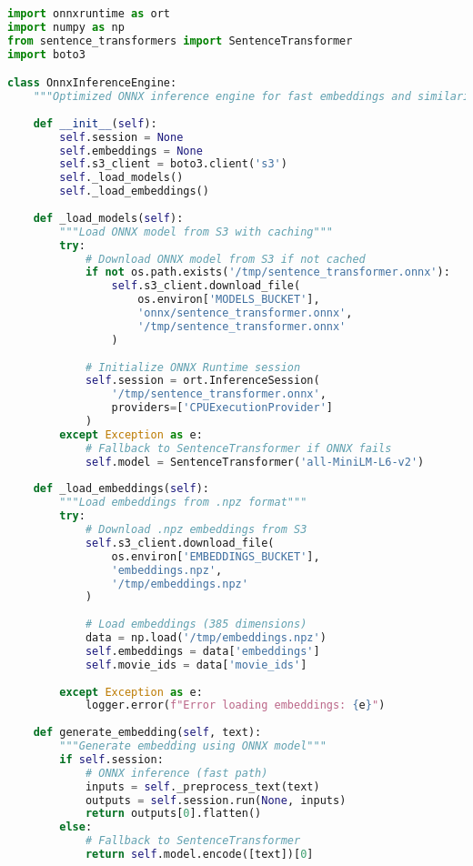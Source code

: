 \documentclass[11pt,a4paper]{article}
\begin{document}
\begin{lstlisting}[language=Python, caption=ONNX Inference Engine]
import onnxruntime as ort
import numpy as np
from sentence_transformers import SentenceTransformer
import boto3

class OnnxInferenceEngine:
    """Optimized ONNX inference engine for fast embeddings and similarity"""
    
    def __init__(self):
        self.session = None
        self.embeddings = None
        self.s3_client = boto3.client('s3')
        self._load_models()
        self._load_embeddings()
    
    def _load_models(self):
        """Load ONNX model from S3 with caching"""
        try:
            # Download ONNX model from S3 if not cached
            if not os.path.exists('/tmp/sentence_transformer.onnx'):
                self.s3_client.download_file(
                    os.environ['MODELS_BUCKET'], 
                    'onnx/sentence_transformer.onnx',
                    '/tmp/sentence_transformer.onnx'
                )
            
            # Initialize ONNX Runtime session
            self.session = ort.InferenceSession(
                '/tmp/sentence_transformer.onnx',
                providers=['CPUExecutionProvider']
            )
        except Exception as e:
            # Fallback to SentenceTransformer if ONNX fails
            self.model = SentenceTransformer('all-MiniLM-L6-v2')
    
    def _load_embeddings(self):
        """Load embeddings from .npz format"""
        try:
            # Download .npz embeddings from S3
            self.s3_client.download_file(
                os.environ['EMBEDDINGS_BUCKET'],
                'embeddings.npz',
                '/tmp/embeddings.npz'
            )
            
            # Load embeddings (385 dimensions)
            data = np.load('/tmp/embeddings.npz')
            self.embeddings = data['embeddings']
            self.movie_ids = data['movie_ids']
            
        except Exception as e:
            logger.error(f"Error loading embeddings: {e}")
    
    def generate_embedding(self, text):
        """Generate embedding using ONNX model"""
        if self.session:
            # ONNX inference (fast path)
            inputs = self._preprocess_text(text)
            outputs = self.session.run(None, inputs)
            return outputs[0].flatten()
        else:
            # Fallback to SentenceTransformer
            return self.model.encode([text])[0]
    

\end{lstlisting}
\end{document}
